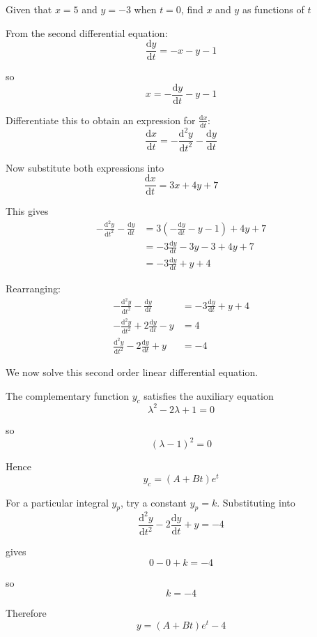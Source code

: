 \documentclass[leqno]{article}
\begin{document}
\begin{enumerate}[
  label=\textbf{\arabic*.},
  leftmargin=*,
  topsep=0pt,
  partopsep=0pt,
  parsep=0pt
]
Given that $x=5$ and $y=-3$ when $t=0$, find $x$ and $y$ as functions of $t$  \\

\vspace*{10pt}

\begin{djsSolution}
From the second differential equation:
\[
\frac{\mathrm{d}y}{\mathrm{d}t}=-x-y-1
\]

so
\[
x=-\frac{\mathrm{d}y}{\mathrm{d}t}-y-1
\]

Differentiate this to obtain an expression for \(\frac{\mathrm{d}x}{\mathrm{d}t}\):
\[
\frac{\mathrm{d}x}{\mathrm{d}t}=-\frac{\mathrm{d}^2y}{\mathrm{d}t^2}-\frac{\mathrm{d}y}{\mathrm{d}t}
\]

Now substitute both expressions into
\[
\frac{\mathrm{d}x}{\mathrm{d}t}=3x+4y+7
\]

This gives
\begin{align*}
-\frac{\mathrm{d}^2y}{\mathrm{d}t^2}-\frac{\mathrm{d}y}{\mathrm{d}t}
&=3\left(-\frac{\mathrm{d}y}{\mathrm{d}t}-y-1\right)+4y+7 \\
&=-3\frac{\mathrm{d}y}{\mathrm{d}t}-3y-3+4y+7 \\
&=-3\frac{\mathrm{d}y}{\mathrm{d}t}+y+4
\end{align*}

Rearranging:
\begin{align*}
-\frac{\mathrm{d}^2y}{\mathrm{d}t^2}-\frac{\mathrm{d}y}{\mathrm{d}t}
&=-3\frac{\mathrm{d}y}{\mathrm{d}t}+y+4 \\
-\frac{\mathrm{d}^2y}{\mathrm{d}t^2}+2\frac{\mathrm{d}y}{\mathrm{d}t}-y
&=4 \\
\frac{\mathrm{d}^2y}{\mathrm{d}t^2}-2\frac{\mathrm{d}y}{\mathrm{d}t}+y
&=-4
\end{align*}

We now solve this second order linear differential equation.

The complementary function \(y_c\) satisfies the auxiliary equation
\[
\lambda^2-2\lambda+1=0
\]

so
\[
(\lambda-1)^2=0
\]

Hence
\[
y_c=(A+Bt)e^t
\]

For a particular integral \(y_p\), try a constant \(y_p=k\). Substituting into
\[
\frac{\mathrm{d}^2y}{\mathrm{d}t^2}-2\frac{\mathrm{d}y}{\mathrm{d}t}+y=-4
\]

gives
\[
0-0+k=-4
\]

so
\[
k=-4
\]

Therefore
\[
y=(A+Bt)e^t-4
\]


\end{djsSolution}
\end{enumerate}
\end{document}
